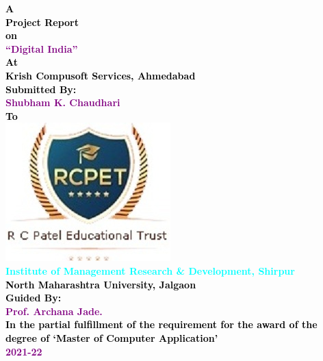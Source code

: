\thispagestyle{empty}

   \begin{center}
   \Huge \bfseries \textcolor{black} {A}\\[.2cm]
   \Huge \bfseries \textcolor{black} {Project Report}\\[.2cm]
	\Huge \bfseries \textcolor{black} {on}\\[.2cm]
   \huge \bfseries \textcolor{purple} {``Digital India''}\\[.10cm]
   \Huge \bfseries \textcolor{black} {At}\\[.2cm]
   \Huge \bfseries \textcolor{black} {Krish Compusoft Services, Ahmedabad}\\[.9cm]
   \large \bfseries \textcolor{black} {Submitted By:}\\[.2cm]
     \Large \bfseries \textcolor{purple} {Shubham K. Chaudhari}\\[.8cm]
     \Large \bfseries \textcolor{black} {To}\\[.2cm]
      \includegraphics[scale=0.5]{Title/111}\\[0.1cm]
      \Large \bfseries \textcolor{cyan} { Institute of Management Research \& Development, Shirpur}\\[0.1cm]
  
      
   \Large \bfseries \textcolor{black} {North Maharashtra University, Jalgaon }\\[.7cm]
   \large \bfseries \textcolor{black} {Guided By:}\\[.2cm]

   \Large \bfseries \textcolor{purple} {Prof. Archana Jade.}\\[1cm]
  
   \large \bfseries \textcolor{black} {  In the partial fulfillment of the requirement for the award of the degree of ‘Master of Computer Application’}\\[0.12cm]
   
   \huge \bfseries \textcolor{purple} {2021-22}\\[0.1cm]
\end{center}
